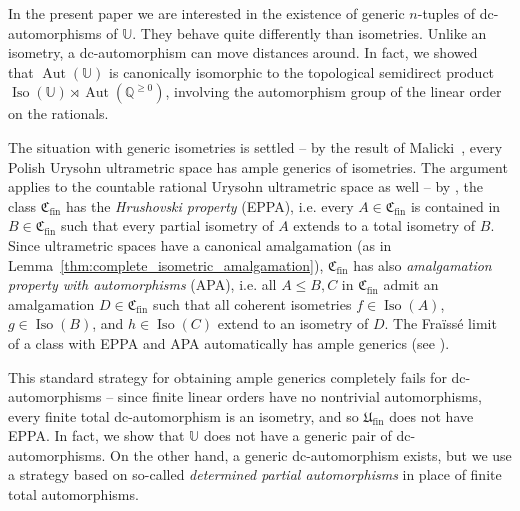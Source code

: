 \documentclass[10pt,a4paper]{article}
\theoremstyle{definition}
\theoremstyle{remark}
\newcommand \Q {\mathbb{Q}}
\newcommand \Qpos {\Q^{\geq 0}}
\newcommand \U {\mathbb{U}}
\newcommand \fin {{\operatorname{fin}}}
\newcommand \Ult {\mathfrak{U}}
\newcommand \Aut {\operatorname{Aut}}
\newcommand \Iso {\operatorname{Iso}}
\begin{document}
In the present paper we are interested in the existence of generic $n$-tuples of dc-automorphisms of $\U$.
They behave quite differently than isometries.
Unlike an isometry, a dc-automorphism can move distances around.
In fact, we showed~\cite[Theorem~4.4]{paper1} that $\Aut(\U)$ is canonically isomorphic to the topological semidirect product $\Iso(\U) \rtimes \Aut(\Qpos)$, involving the automorphism group of the linear order on the rationals.

The situation with generic isometries is settled – by the result of Malicki~\cite[Corollary~6.1]{Mal}, every Polish Urysohn ultrametric space has ample generics of isometries.
The argument applies to the countable rational Urysohn ultrametric space as well – by \cite[Lemma~4.2]{Mal}, the class $\mathfrak{C}_\fin$ has the \emph{Hrushovski property} (EPPA), i.e.  every $A \in \mathfrak{C}_\fin$ is contained in $B \in \mathfrak{C}_\fin$ such that every partial isometry of $A$ extends to a total isometry of $B$.
Since ultrametric spaces have a canonical amalgamation (as in Lemma~\ref{thm:complete_isometric_amalgamation}), $\mathfrak{C}_\fin$ has also \emph{amalgamation property with automorphisms} (APA), i.e. all $A \leq B, C$ in $\mathfrak{C}_\fin$ admit an amalgamation $D \in \mathfrak{C}_\fin$ such that all coherent isometries $f \in \Iso(A)$, $g \in \Iso(B)$, and $h \in \Iso(C)$ extend to an isometry of $D$.
The Fraïssé limit of a class with EPPA and APA automatically has ample generics (see \cite[Theorem~2.1.5]{Siniora}).

This standard strategy for obtaining ample generics completely fails for dc-automorphisms – since finite linear orders have no nontrivial automorphisms, every finite total dc-automorphism is an isometry, and so $\Ult_\fin$ does not have EPPA.
In fact, we show that $\U$ does not have a generic pair of dc-automorphisms.
On the other hand, a generic dc-automorphism exists, but we use a strategy based on so-called \emph{determined partial automorphisms} in place of finite total automorphisms.
\end{document}
